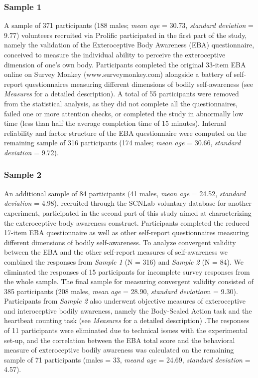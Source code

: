 \documentclass[man]{apa7}
\begin{document}
\subsubsection{Sample 1}
A sample of 371 participants (188 males; \emph{mean age} = 30.73, \emph{standard deviation} = 9.77) volunteers recruited via Prolific participated in the first part of the study, namely the validation of the Exteroceptive Body Awareness (EBA) questionnaire, conceived to measure the individual ability to perceive the exteroceptive dimension of one’s own body. Participants completed the original 33-item EBA online on Survey Monkey (www.surveymonkey.com) alongside a battery of self-report questionnaires measuring different dimensions of bodily self-awareness (see \emph{Measures} for a detailed description).
A total of 55 participants were removed from the statistical analysis, as they did not complete all the questionnaires, failed one or more attention checks, or completed the study in abnormally low time (less than half the average completion time of 15 minutes). Internal reliability and factor structure of the EBA questionnaire were computed on the remaining sample of 316 participants (174 males; \emph{mean age} = 30.66, \emph{standard deviation} = 9.72). 
\subsubsection{Sample 2}
An additional sample of 84 participants (41 males, \emph{mean age} = 24.52, \emph{standard deviation} = 4.98), recruited through the SCNLab voluntary database for another experiment, participated in the second part of this study aimed at characterizing the exteroceptive body awareness construct. Participants completed the reduced 17-item EBA questionnaire as well as other self-report questionnaires measuring different dimensions of bodily self-awareness. To analyze convergent validity between the EBA and the other self-report measures of self-awareness we combined the responses from \emph{Sample 1} (N = 316) and \emph{Sample 2} (N = 84). We eliminated the responses of 15 participants for incomplete survey responses from the whole sample. The final sample for measuring convergent validity consisted of 385 participants (208 males, \emph{mean age} = 28.90, \emph{standard deviation}n = 9.30). Participants from \emph{Sample 2} also underwent objective measures of exteroceptive and interoceptive bodily awareness, namely the Body-Scaled Action task and the heartbeat counting task (see \emph{Measures} for a detailed description)
.The responses of 11 participants were eliminated due to technical issues with the experimental set-up, and the correlation between the EBA total score and the behavioral measure of exteroceptive bodily awareness was calculated on the remaining sample of 71 participants (males = 33, \emph{meand age} = 24.69, \emph{standard deviation} = 4.57).
\end{document}
